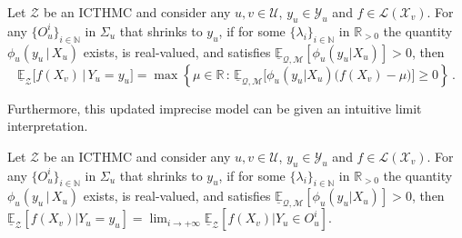 \documentclass[twoside,11pt]{article}
\newcommand{\nats}{\mathbb{N}}
\newcommand{\reals}{\mathbb{R}}
\newcommand{\realspos}{\reals_{>0}}
\newcommand{\states}{\mathcal{X}}
\newcommand{\observs}{\mathcal{Y}}
\newcommand{\lexp}{\underline{\mathbb{E}}_{\rateset,\mathcal{M}}}
\newcommand{\gambles}{\mathcal{L}}
\newcommand{\rateset}{\mathcal{Q}}
\begin{document}
\begin{proposition}\label{prop:GBR_for_densities_lower_zero}
Let $\mathcal{Z}$ be an ICTHMC and consider any $u,v\in\mathcal{U}$, $y_u\in\observs_u$ and $f\in\gambles(\states_v)$. For any $\{O_u^i\}_{i\in\nats}$ in $\Sigma_u$ that shrinks to $y_u$, if for some $\{\lambda_i\}_{i\in\nats}$ in $\realspos$ the quantity $\phi_u(y_u\,\vert\,X_u)$ exists, is real-valued, and satisfies $\lexp[\phi_u(y_u\vert X_u)]>0$, then
\begin{equation}\label{eq:gbr_densities}
\underline{\mathbb{E}}_{\mathcal{Z}}\bigl[f(X_v)\,\vert\,Y_u = y_u\bigr] = \max\left\{\mu\in\reals\,:\, \lexp\bigl[\phi_u(y_u\vert X_u)\bigl(f(X_v) - \mu\bigr)\bigr] \geq 0\right\}\,.
\end{equation}
\end{proposition}
Furthermore, this updated imprecise model can be given an intuitive limit interpretation.
\begin{proposition}\label{prop:GBR_for_densities_is_limit_if_continuous}
Let $\mathcal{Z}$ be an ICTHMC and consider any $u,v\in\mathcal{U}$, $y_u\in\observs_u$ and $f\in\gambles(\states_v)$. For any $\{O_u^i\}_{i\in\nats}$ in $\Sigma_u$ that shrinks to $y_u$, if for some $\{\lambda_i\}_{i\in\nats}$ in $\realspos$ the quantity $\phi_u(y_u\,\vert\,X_u)$ exists, is real-valued, and satisfies $\lexp[\phi_u(y_u\vert X_u)]>0$, then $\underline{\mathbb{E}}_\mathcal{Z}[f(X_v)\vert Y_u=y_u] 
 = \lim_{i\to+\infty}\underline{\mathbb{E}}_\mathcal{Z}[f(X_v)\vert Y_u\in O_u^i]$.
\end{proposition}
\end{document}
